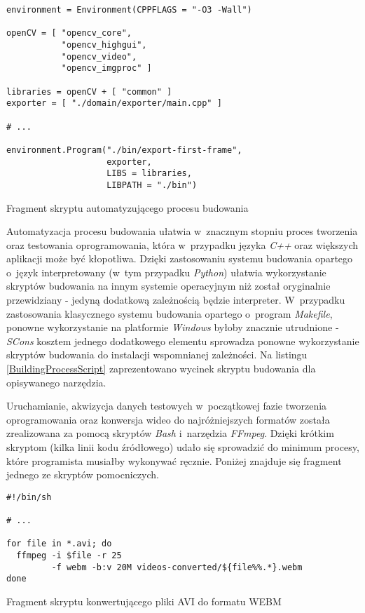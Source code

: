           \begin{sample}[ht]
            \begin{verbatim}
environment = Environment(CPPFLAGS = "-O3 -Wall")

openCV = [ "opencv_core",
           "opencv_highgui",
           "opencv_video",
           "opencv_imgproc" ]

libraries = openCV + [ "common" ]
exporter = [ "./domain/exporter/main.cpp" ]

# ...

environment.Program("./bin/export-first-frame",
                    exporter,
                    LIBS = libraries,
                    LIBPATH = "./bin")
            \end{verbatim}
            \caption{Fragment skryptu automatyzującego procesu budowania}
            \label{BuildingProcessScript}
          \end{sample}

        Automatyzacja procesu budowania ułatwia w~znacznym stopniu proces tworzenia oraz testowania oprogramowania, która w~przypadku języka \textit{C++} oraz większych aplikacji może być kłopotliwa. Dzięki zastosowaniu systemu budowania opartego o~język interpretowany (w~tym przypadku \textit{Python}) ułatwia wykorzystanie skryptów budowania na innym systemie operacyjnym niż został oryginalnie przewidziany - jedyną dodatkową zależnością będzie interpreter. W~przypadku zastosowania klasycznego systemu budowania opartego o~program \textit{Makefile}, ponowne wykorzystanie na platformie \textit{Windows} byłoby znacznie utrudnione - \textit{SCons} kosztem jednego dodatkowego elementu sprowadza ponowne wykorzystanie skryptów budowania do instalacji wspomnianej zależności. Na listingu \ref{BuildingProcessScript} zaprezentowano wycinek skryptu budowania dla opisywanego narzędzia.

        Uruchamianie, akwizycja danych testowych w~początkowej fazie tworzenia oprogramowania oraz konwersja wideo do najróżniejszych formatów została zrealizowana za pomocą skryptów \textit{Bash} i~narzędzia \textit{FFmpeg}. Dzięki krótkim skryptom (kilka linii kodu źródłowego) udało się sprowadzić do minimum procesy, które programista musiałby wykonywać ręcznie. Poniżej znajduje się fragment jednego ze skryptów pomocniczych.

        \begin{sample}[ht]
          \begin{verbatim}
#!/bin/sh

# ...

for file in *.avi; do
  ffmpeg -i $file -r 25
         -f webm -b:v 20M videos-converted/${file%%.*}.webm
done
          \end{verbatim}
          \caption{Fragment skryptu konwertującego pliki AVI do formatu WEBM}
          \label{UtilityScript}
        \end{sample}


